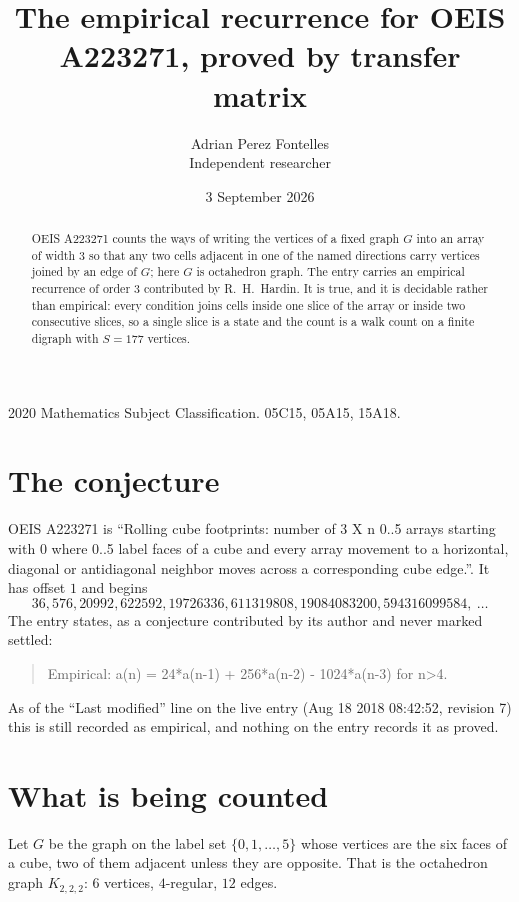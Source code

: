 \documentclass[11pt,a4paper]{article}
\title{The empirical recurrence for OEIS A223271, proved by transfer matrix}
\author{Adrian Perez Fontelles\\ \small Independent researcher}
\date{3 September 2026}
\theoremstyle{plain}
\theoremstyle{definition}
\begin{document}
\maketitle

\begin{abstract}
OEIS A223271 counts the ways of writing the vertices of a fixed graph $G$ into an array of width
$3$ so that any two cells adjacent in one of the named directions carry vertices joined by an
edge of $G$; here $G$ is octahedron graph. The entry carries an empirical recurrence of order $3$
contributed by R.~H.~Hardin. It is true, and it is decidable rather than empirical: every
condition joins cells inside one slice of the array or inside two consecutive slices, so a
single slice is a state and the count is a walk count on a finite digraph with $S=177$ vertices.
\end{abstract}

\noindent\small 2020 Mathematics Subject Classification. 05C15, 05A15, 15A18.\normalsize

\section{The conjecture}

OEIS A223271 is ``Rolling cube footprints: number of 3 X n 0..5 arrays starting with 0 where 0..5 label faces of a cube and every array movement to a horizontal, diagonal or antidiagonal neighbor moves across a corresponding cube edge.''. It has offset $1$ and begins
\[
36, 576, 20992, 622592, 19726336, 611319808, 19084083200, 594316099584,\ \dots
\]
The entry states, as a conjecture contributed by its author and never marked settled:
\begin{quote}
Empirical: a(n) = 24*a(n-1) + 256*a(n-2) - 1024*a(n-3) for n>4.
\end{quote}
As of the ``Last modified'' line on the live entry (Aug 18 2018 08:42:52, revision 7) this is still
recorded as empirical, and nothing on the entry records it as proved.

\section{What is being counted}

Let $G$ be the graph on the label set $\{0,1,\dots,5\}$ whose vertices are the six faces of a cube, two of them adjacent unless they are opposite. That is the octahedron graph $K_{2,2,2}$: $6$ vertices, $4$-regular, $12$ edges.
\end{document}
